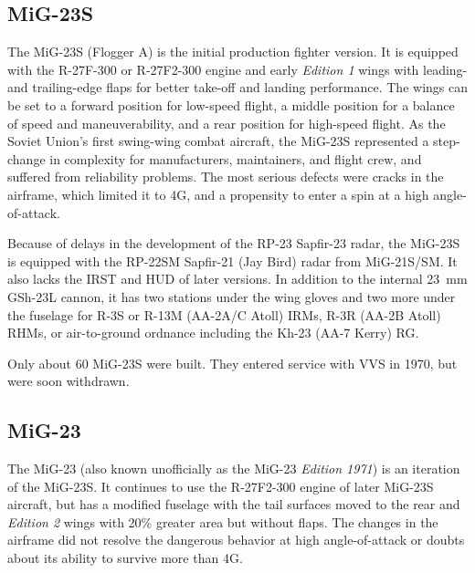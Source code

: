 \subsection{MiG-23S}

The MiG-23S (Flogger A) is the initial production fighter version.
It is equipped with the R-27F-300 or R-27F2-300 engine and early \emph{Edition 1} wings with leading- and trailing-edge flaps for better take-off and landing performance. The wings can be set to a forward position for low-speed flight, a middle position for a balance of speed and maneuverability, and a rear position for high-speed flight.
As the Soviet Union's first swing-wing combat aircraft, the MiG-23S represented a step-change in complexity for manufacturers, maintainers, and flight crew, and suffered from reliability problems. The most serious defects were cracks in the airframe, which limited it to 4G, and a propensity to enter a spin at a high angle-of-attack.

Because of delays in the development of the RP-23 Sapfir-23 radar, the MiG-23S is equipped with the RP-22SM Sapfir-21 (Jay Bird) radar from MiG-21S/SM.
It also lacks the IRST and HUD of later versions.
In addition to the internal 23~mm GSh-23L cannon, it has two stations under the wing gloves and two more under the fuselage for R-3S or R-13M (AA-2A/C Atoll) IRMs, R-3R (AA-2B Atoll) RHMs, or air-to-ground ordnance including the Kh-23 (AA-7 Kerry) RG.

Only about 60 MiG-23S were built. They entered service with VVS in 1970, but were soon withdrawn.%

\subsection{MiG-23}

The MiG-23 (also known unofficially as the MiG-23 \emph{Edition 1971}) is an iteration of the MiG-23S.
It continues to use the R-27F2-300 engine of later MiG-23S aircraft, but has a modified fuselage with the tail surfaces moved to the rear and \emph{Edition 2} wings with 20\% greater area but without flaps.
The changes in the airframe did not resolve the dangerous behavior at high angle-of-attack or doubts about its ability to survive more than 4G.


